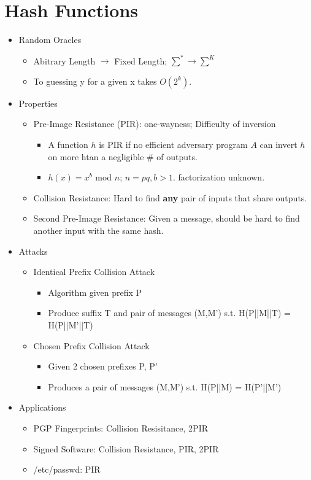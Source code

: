 \section{Hash Functions}
\begin{itemize}
\item Random Oracles
    \begin{itemize}
    \item Abitrary Length $\rightarrow$ Fixed Length; $\sum^* \rightarrow \sum^K$
    \item To guessing y for a given x takes $O(2^k)$.
    \end{itemize}
\item Properties
    \begin{itemize}
    \item Pre-Image Resistance (PIR): one-wayness; Difficulty of inversion
        \begin{itemize}
        \item A function $h$ is PIR if no efficient adversary program $A$ can invert $h$ on more htan a negligible # of outputs.
        \item $h(x) = x^b$ mod $n$; $n=pq, b>1$. factorization unknown.
        \end{itemize}
    \item Collision Resistance: Hard to find \textbf{any} pair of inputs that share outputs.
    \item Second Pre-Image Resistance: Given a message, should be hard to find another input with the same hash.
    \end{itemize}
\item Attacks
    \begin{itemize}
    \item Identical Prefix Collision Attack
        \begin{itemize}
        \item Algorithm given prefix P
        \item Produce suffix T and pair of messages (M,M') s.t. H(P||M||T) = H(P||M'||T)
        \end{itemize}
    \item Chosen Prefix Collision Attack
        \begin{itemize}
        \item Given 2 chosen prefixes P, P'
        \item Produces a pair of messages (M,M') s.t. H(P||M) = H(P'||M')
        \end{itemize}
    \end{itemize}
\item Applications
    \begin{itemize}
    \item PGP Fingerprints: Collision Resisitance, 2PIR
    \item Signed Software: Collision Resistance, PIR, 2PIR
    \item /etc/passwd: PIR
    \end{itemize}
\end{itemize}